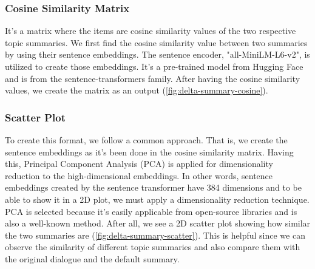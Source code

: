 \subsubsection{Cosine Similarity Matrix}
It's a matrix where the items are cosine similarity values of the two respective topic summaries. We first find the cosine similarity value between two summaries by using their sentence embeddings. The sentence encoder, "all-MiniLM-L6-v2", is utilized to create those embeddings. It's a pre-trained model from Hugging Face and is from the sentence-transformers family. After having the cosine similarity values, we create the matrix as an output (\ref{fig:delta-summary-cosine}).
\subsubsection{Scatter Plot}
To create this format, we follow a common approach. That is, we create the sentence embeddings as it's been done in the cosine similarity matrix. Having this, Principal Component Analysis (PCA) is applied for dimensionality reduction to the high-dimensional embeddings. In other words, sentence embeddings created by the sentence transformer have 384 dimensions and to be able to show it in a 2D plot, we must apply a dimensionality reduction technique. PCA is selected because it's easily applicable from open-source libraries and is also a well-known method. After all, we see a 2D scatter plot showing how similar the two summaries are (\ref{fig:delta-summary-scatter}). This is helpful since we can observe the similarity of different topic summaries and also compare them with the original dialogue and the default summary.